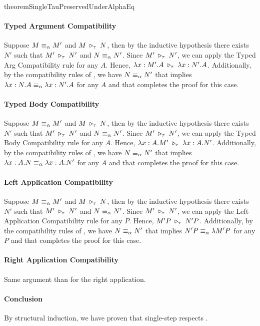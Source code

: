 \begin{longproof}{theoremSingleTauPreservedUnderAlphaEq}
\paragraph{Typed Argument Compatibility}
Suppose $M \equiv_\alpha M'$ and $M \;\triangleright_\tau\; N$, then by the inductive hypothesis there exists $N'$ such that $M' \;\triangleright_\tau\; N'$ and $N \equiv_\alpha N'$. Since $M' \;\triangleright_\tau\; N'$, we can apply the Typed Arg Compatibility rule for any $A$. Hence, $\lambda x:M'.A \;\triangleright_\tau\; \lambda x:N'.A$. Additionally, by the compatibility rules of \alphaequivalence, we have $N \equiv_\alpha N'$ that implies $\lambda x:N.A \equiv_\alpha \lambda x:N'.A$ for any $A$ and that completes the proof for this case.

\paragraph{Typed Body Compatibility}
Suppose $M \equiv_\alpha M'$ and $M \;\triangleright_\tau\; N$, then by the inductive hypothesis there exists $N'$ such that $M' \;\triangleright_\tau\; N'$ and $N \equiv_\alpha N'$. Since $M' \;\triangleright_\tau\; N'$, we can apply the Typed Body Compatibility rule for any $A$. Hence, $\lambda x:A.M' \;\triangleright_\tau\; \lambda x:A.N'$. Additionally, by the compatibility rules of \alphaequivalence, we have $N \equiv_\alpha N'$ that implies $\lambda x:A.N \equiv_\alpha \lambda x:A.N'$ for any $A$ and that completes the proof for this case.

\paragraph{Left Application Compatibility}
Suppose $M \equiv_\alpha M'$ and $M \;\triangleright_\tau\; N$, then by the inductive hypothesis there exists $N'$ such that $M' \;\triangleright_\tau\; N'$ and $N \equiv_\alpha N'$. Since $M' \;\triangleright_\tau\; N'$, we can apply the Left Application Compatibility rule for any $P$. Hence, $M'P \;\triangleright_\tau\; N'P$. Additionally, by the compatibility rules of \alphaequivalence, we have $N \equiv_\alpha N'$ that implies $N'P \equiv_\alpha \lambda M'P$ for any $P$ and that completes the proof for this case.

\paragraph{Right Application Compatibility}
Same argument than for the right application.

\paragraph{Conclusion}
By structural induction, we have proven that single-step \taureduction respects \alphaequivalence.

\end{longproof}


